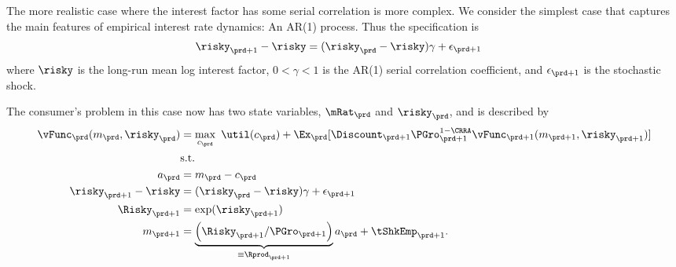 \documentclass[titlepage, headings=optiontotocandhead]{econark}
\begin{document}
{%


The more realistic case where the interest factor has some serial correlation is more complex.  We consider
the simplest case that captures the main features of empirical interest rate dynamics: An AR(1) process.  Thus
the specification is
\begin{equation}\begin{gathered}\begin{aligned}
  \risky_{\prd+1}-\risky  & = (\risky_{\prd}-\risky) \gamma + \epsilon_{\prd+1}
\end{aligned}\end{gathered}\end{equation}
where $\risky$ is the long-run mean log interest factor, $0 < \gamma < 1$ is the AR(1) serial correlation
coefficient, and $\epsilon_{\prd+1}$ is the stochastic shock.

The consumer's problem in this case now has two state variables, $\mRat_{\prd}$ and $\risky_{\prd}$, and
is described by
\begin{equation}\begin{gathered}\begin{aligned}
        \vFunc_{\prd}(m_{\prd},\risky_{\prd})  & = \max_{{c}_{\prd}} ~ \util(c_{\prd})+
        \Ex_{\prd}[{\Discount}_{\prd+1}\PGro_{\prd+1}^{1-\CRRA}\vFunc_{\prd+1}(m_{\prd+1},\risky_{\prd+1})] \label{vtNormRisky}
\\         & \text{s.t.}   \nonumber \\
    a_{\prd}    & = m_{\prd}-c_{\prd} \nonumber
\\      \risky_{\prd+1}-\risky  & = (\risky_{\prd}-\risky)\gamma + \epsilon_{\prd+1} \notag
\\      \Risky_{\prd+1}  & = \exp(\risky_{\prd+1}) \notag
\\      m_{\prd+1}  & = \underbrace{\left(\Risky_{\prd+1}/\PGro_{\prd+1}\right)}_{\equiv \Rprod_{\prd+1}}a_{\prd}+\tShkEmp_{\prd+1} \nonumber.
\end{aligned}\end{gathered}\end{equation}


}
\end{document}
